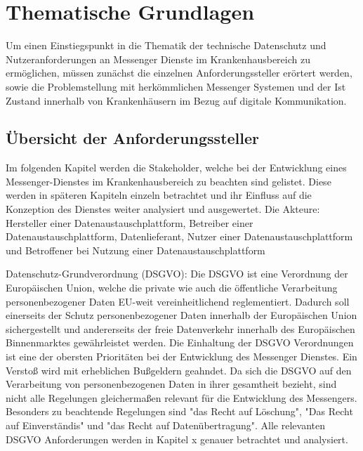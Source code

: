 \chapter{Thematische Grundlagen}\label{chapter:hintergrund}
Um einen Einstiegspunkt in die Thematik der technische Datenschutz und Nutzeranforderungen an Messenger Dienste im Krankenhausbereich zu ermöglichen, müssen zunächst die einzelnen Anforderungssteller erörtert werden, sowie die Problemstellung mit herkömmlichen Messenger Systemen und der Ist Zustand innerhalb von Krankenhäusern im Bezug auf digitale Kommunikation.

\section{Übersicht der Anforderungssteller}\label{section:ueda}
Im folgenden Kapitel werden die Stakeholder, welche bei der Entwicklung eines Messenger-Dienstes im Krankenhausbereich zu beachten sind gelistet. Diese werden in späteren Kapiteln einzeln betrachtet und ihr Einfluss auf die Konzeption des Dienstes weiter analysiert und ausgewertet. Die Akteure: Hersteller einer Datenaustauschplattform, Betreiber einer Datenaustauschplattform, Datenlieferant, Nutzer einer Datenaustauschplattform und Betroffener bei Nutzung einer Datenaustauschplattform

Datenschutz-Grundverordnung (DSGVO): Die DSGVO ist eine Verordnung der Europäischen Union, welche die private wie auch die öffentliche Verarbeitung personenbezogener Daten EU-weit vereinheitlichend reglementiert. Dadurch soll einerseits der Schutz personenbezogener Daten innerhalb der Europäischen Union sichergestellt und andererseits der freie Datenverkehr innerhalb des Europäischen Binnenmarktes gewährleistet werden. Die Einhaltung der DSGVO Verordnungen ist eine der obersten Prioritäten bei der Entwicklung des Messenger Dienstes. Ein Verstoß wird mit erheblichen Bußgeldern geahndet. Da sich die DSGVO auf den Verarbeitung von personenbezogenen Daten in ihrer gesamtheit bezieht, sind nicht alle Regelungen gleichermaßen relevant für die Entwicklung des Messengers. Besonders zu beachtende Regelungen sind "das Recht auf Löschung", "Das Recht auf Einverständis" und "das Recht auf Datenübertragung". Alle relevanten DSGVO Anforderungen werden in Kapitel x genauer betrachtet und analysiert.

